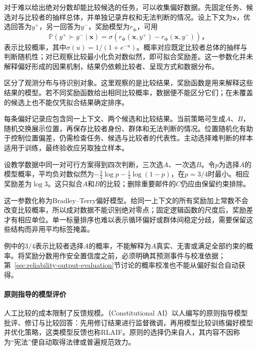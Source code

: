 对于难以给出绝对分数却能比较候选的任务，可以收集偏好数据。先固定任务、候选对与比较者的抽样总体，并单独记录弃权和无法判断的情况。设上下文为$\bm{x}$，优选回答为$y^+$，另一回答为$y^-$，奖励模型为$r_{\bm\phi}$，可用
\[
 \mathbb P(y^+\succ y^-\mid\bm{x})
 =\sigma\!\left(r_{\bm{\phi}}(\bm{x},y^+)
              -r_{\bm{\phi}}(\bm{x},y^-)\right)\text{，}
\]
表示比较概率，其中$\sigma(u)=1/(1+e^{-u})$。概率对应既定比较者总体的抽样与判断随机性；对已观察比较最小化负对数似然，即可拟合奖励差。这一参数化并未解释偏好形成的因果机制，结果仍依赖比较者、呈现方式和数据分布。

区分了观测分布与待识别对象。这里观察的是比较结果，奖励函数是用来解释这些结果的模型。若不同奖励函数给出相同比较概率，数据便不能区分它们；在未覆盖的候选上也不能仅凭拟合结果确定排序。

每条偏好记录应包含同一上下文、两个候选和比较结果。当前策略可生成$A$、$B$，随机交换展示位置，再保存比较者身份、群体和无法判断的情况。位置随机化有助于控制位置偏差，仍需检查任务、候选与比较者的代表性。主动选择难判断的样本适用于训练，最终验收应另取独立样本。

设教学数据中同一对可行方案得到四次判断，三次选$A$、一次选$B$。令$p$为选择$A$的模型概率，平均负对数似然为$-\tfrac34\log p-\tfrac14\log(1-p)$，在$p=3/4$时最小。相应奖励差为$\log3$。这只拟合$A$和$B$的比较；删除重要邮件的$C$仍应由保留约束排除。

这一参数化称为Bradley--Terry偏好模型。给同一上下文的所有奖励加上常数不会改变比较概率，所以成对数据不能识别绝对零点；固定逻辑函数的尺度后，奖励差才有相应单位。单一标量排序也难以表示循环偏好或群体间稳定分歧，需要保留这些结构而非用平均标签掩盖。

例中的$3/4$表示比较者选择$A$的概率，不能解释为$A$真实、无害或满足全部约束的概率。将奖励分数用作安全置信度之前，必须明确其预测事件与校准依据；第~\ref{sec:reliability-output-evaluation}节讨论的概率校准也不能从偏好拟合自动获得。

\paragraph{原则指导的模型评价}

人工比较的成本限制了反馈规模。（Constitutional AI）以人编写的原则指导模型批评、修订与比较回答：先用修订结果进行监督微调，再用模型比较训练偏好模型并优化策略，这类模型反馈也称RLAIF。原则的选择仍来自人，其内容不因称为“宪法”便自动取得法律或普遍规范效力。


